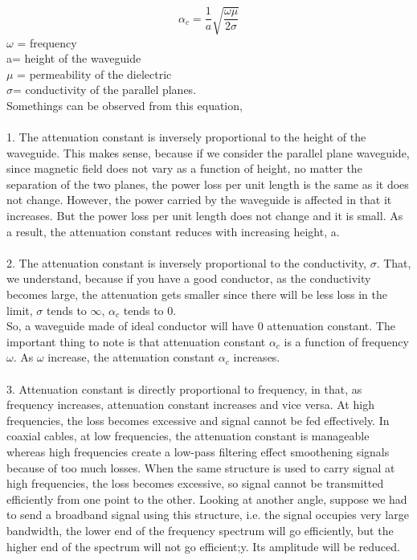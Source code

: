 \begin{equation}
\alpha_c=\frac{1}{a}\sqrt{\frac{\omega\mu}{2\sigma}}
\end{equation}
$\omega$ = frequency\\
a= height of the waveguide\\
$\mu$ = permeability of the dielectric\\
$\sigma$= conductivity of the parallel planes.\\
Somethings can be observed from this equation,\\\\
1. The attenuation constant is inversely proportional to the height of the waveguide. This makes sense, because if we consider the parallel plane waveguide, since magnetic field does not vary as a function of height, no matter the separation of the two planes, the power loss per unit length is the same as it does not change. However, the power carried by the waveguide is affected in that it increases. But the power loss per unit length does not change and it is small. As a result, the attenuation constant reduces with increasing height, a.\\\\
2. The attenuation constant is inversely proportional to the conductivity, $\sigma$. That, we understand, because if you have a good conductor, as the conductivity becomes large, the attenuation gets smaller since there will be less loss in the limit, $\sigma$ tends to $\infty$, $\alpha_{c}$ tends to 0.\\
So, a waveguide made of ideal conductor will have 0 attenuation constant. The important thing to note is that attenuation constant $\alpha_{c}$ is a function of frequency $\omega$. As $\omega$ increase, the attenuation constant $\alpha_{c}$ increases.\\\\
3. Attenuation constant is directly proportional to frequency, in that, as frequency increases, attenuation constant increases and vice versa. At high frequencies, the loss becomes excessive and signal cannot be fed effectively. In coaxial cables, at low frequencies, the attenuation constant is manageable whereas high frequencies create a low-pass filtering effect smoothening signals because of too much losses. When the same structure is used to carry signal at high frequencies, the loss becomes excessive, so signal cannot be transmitted efficiently from one point to the other. Looking at another angle, suppose we had to send a broadband signal using this structure, i.e. the signal occupies very large bandwidth, the lower end of the frequency spectrum will go efficiently, but the higher end of the spectrum will not go efficient;y. Its amplitude will be reduced.\\

